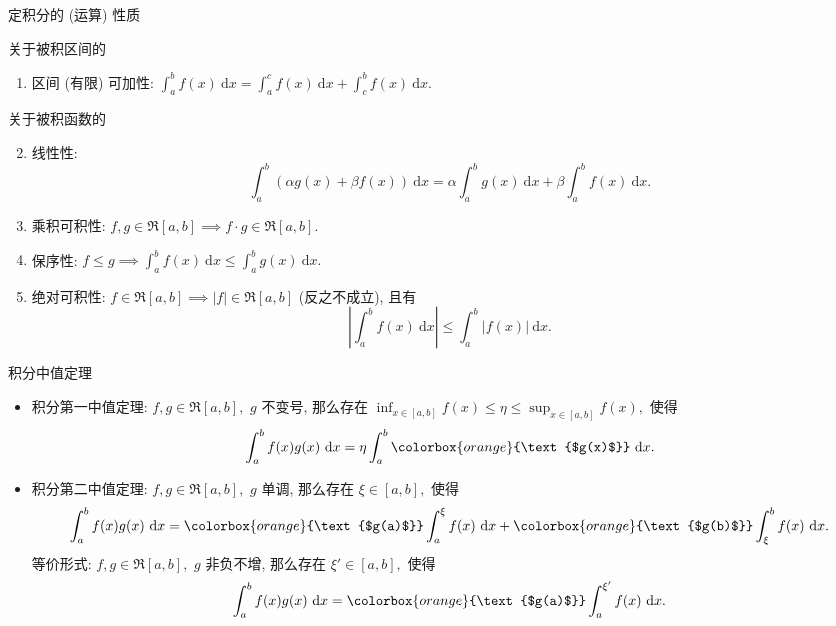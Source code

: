 \begin{frame}{定积分的 (运算) 性质}

关于被积区间的
\pause
\begin{enumerate}
\item 区间 (有限) 可加性: $\int_a^b f(x) ~ \mathrm{d} x = \int_a^c f(x) ~ \mathrm{d} x + \int_c^b f(x) ~ \mathrm{d} x.$
\end{enumerate}

\pause

关于被积函数的
\pause
\begin{enumerate}[<+->]
\setcounter{enumi}{1}
\item 线性性:
\[\int_a^b (\alpha g(x) + \beta f(x)) ~ \mathrm{d} x = \alpha \int_a^b g(x) ~ \mathrm{d} x + \beta \int_a^b f(x) ~ \mathrm{d} x.\]
\item 乘积可积性: $f, g \in \mathfrak{R}[a, b] \implies f \cdot g \in \mathfrak{R}[a, b].$
\item 保序性: $f \leqslant g \implies \int_a^b f(x) ~ \mathrm{d} x \leqslant \int_a^b g(x) ~ \mathrm{d} x.$
\item 绝对可积性: $f \in \mathfrak{R}[a, b] \implies \lvert f \rvert \in \mathfrak{R}[a, b]$ ({\color{red}反之不成立}), 且有
\[\left\lvert \int_a^b f(x) ~ \mathrm{d} x \right\rvert \leqslant \int_a^b \lvert f(x) \rvert ~ \mathrm{d} x.\]
\end{enumerate}

\end{frame}


\begin{frame}{积分中值定理}

\begin{itemize}
\item 积分第一中值定理: $f, g \in \mathfrak{R}[a, b],$ {\color{red}$g$ 不变号}, 那么存在 $\inf_{x \in [a,b]} f(x) \leqslant \eta \leqslant \sup_{x \in [a,b]} f(x),$ 使得
\[\int_a^b f(x) g(x) ~ \mathrm{d} x = \eta \int_a^b \colorbox{orange}{\text{$g(x)$}} ~ \mathrm{d} x.\]
\pause
\item 积分第二中值定理: $f, g \in \mathfrak{R}[a, b],$ {\color{red}$g$ 单调}, 那么存在 $\xi \in [a, b],$ 使得
\[\int_a^b f(x) g(x) ~ \mathrm{d} x = \colorbox{orange}{\text{$g(a)$}} \int_a^\xi f(x) ~ \mathrm{d} x + \colorbox{orange}{\text{$g(b)$}} \int_{\xi}^b f(x) ~ \mathrm{d} x.\]
\pause
等价形式: $f, g \in \mathfrak{R}[a, b],$ {\color{red}$g$ 非负不增}, 那么存在 $\xi' \in [a, b],$ 使得
\[\int_a^b f(x) g(x) ~ \mathrm{d} x = \colorbox{orange}{\text{$g(a)$}} \int_a^{\xi'} f(x) ~ \mathrm{d} x.\]
\end{itemize}

\end{frame}

